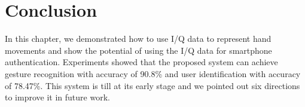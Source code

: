 \section{Conclusion}
In this chapter, we demonstrated how to use I/Q data to represent hand movements and show the potential of using the I/Q data for smartphone authentication. Experiments showed that the proposed {\uu} system can achieve gesture recognition with accuracy of 90.8\% and user identification with accuracy of 78.47\%. This {\uu} system is till at its early stage and we pointed out six directions to improve it in future work.